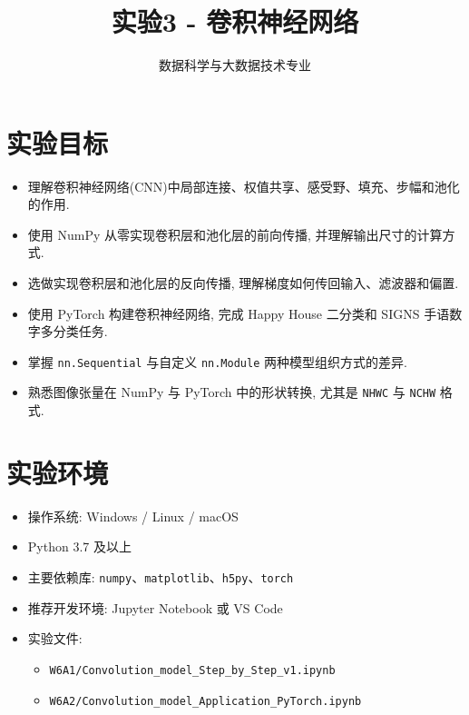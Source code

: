 \documentclass{../../nndlcourse}
\begin{document}
\title{实验3 - 卷积神经网络}
\author{数据科学与大数据技术专业}
\date{}
\maketitle


\section{实验目标}
\begin{itemize}
    \item 理解卷积神经网络(CNN)中局部连接、权值共享、感受野、填充、步幅和池化的作用.
    \item 使用 NumPy 从零实现卷积层和池化层的前向传播, 并理解输出尺寸的计算方式.
    \item 选做实现卷积层和池化层的反向传播, 理解梯度如何传回输入、滤波器和偏置.
    \item 使用 PyTorch 构建卷积神经网络, 完成 Happy House 二分类和 SIGNS 手语数字多分类任务.
    \item 掌握 \texttt{nn.Sequential} 与自定义 \texttt{nn.Module} 两种模型组织方式的差异.
    \item 熟悉图像张量在 NumPy 与 PyTorch 中的形状转换, 尤其是 \texttt{NHWC} 与 \texttt{NCHW} 格式.
\end{itemize}


\section{实验环境}
\begin{itemize}
    \item 操作系统: Windows / Linux / macOS
    \item Python 3.7 及以上
    \item 主要依赖库: \texttt{numpy}、\texttt{matplotlib}、\texttt{h5py}、\texttt{torch}
    \item 推荐开发环境: Jupyter Notebook 或 VS Code
    \item 实验文件:
    \begin{itemize}
        \item \texttt{W6A1/Convolution\_model\_Step\_by\_Step\_v1.ipynb}
        \item \texttt{W6A2/Convolution\_model\_Application\_PyTorch.ipynb}
    \end{itemize}
\end{itemize}
\end{document}
